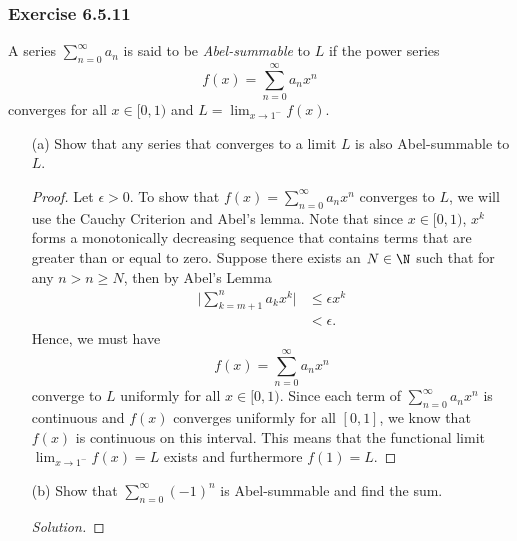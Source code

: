 \subsubsection{Exercise 6.5.11} A series \( \sum_{ n=0  }^{ \infty  } a_n  \) is said to be \textit{Abel-summable}  to \( L  \) if the power series 
\[  f(x) = \sum_{ n=0  }^{ \infty  } a_n x^n  \] converges for all \( x \in [0,1) \) and \( L = \lim_{ x \to 1^{-} } f(x) \).
\begin{enumerate}
    \item[(a)] Show that any series that converges to a limit \( L  \) is also Abel-summable to \( L  \).
        \begin{proof}
            Let \( \epsilon > 0  \). To show that \( f(x) = \sum_{ n=0 }^{ \infty  } a_n x^n   \) converges to \( L  \), we will use the Cauchy Criterion and Abel's lemma. Note that since \( x \in [0,1) \), \( x^k   \) forms a monotonically decreasing sequence that contains terms that are greater than or equal to zero. Suppose there exists an \( N \in \N  \) such that for any \( n > n \geq N  \), then by Abel's Lemma 
        \begin{align*}
            \Big| \sum_{ k=m+1 }^{ n } a_k x^k  \Big|  &\leq \epsilon x^k  \\
                                                       &< \epsilon.
        \end{align*}
        Hence, we must have 
        \[  f(x) = \sum_{ n=0 }^{ \infty  } a_n x^n  \] converge to \( L  \) uniformly for all \( x \in [0,1) \). Since each term of \( \sum_{ n=0 }^{ \infty  } a_n x^n  \) is continuous and \( f(x)  \) converges uniformly for all \( [0, 1] \), we know that \( f(x)  \) is continuous on this interval. This means that the functional limit \( \lim_{ x \to 1^{-} } f(x) = L  \) exists and furthermore \( f(1) = L  \).
        \end{proof}
    \item[(b)] Show that \( \sum_{ n=0 }^{ \infty  } (-1)^n  \) is Abel-summable and find the sum.
        \begin{proof}[Solution]
        
        \end{proof}
\end{enumerate}


